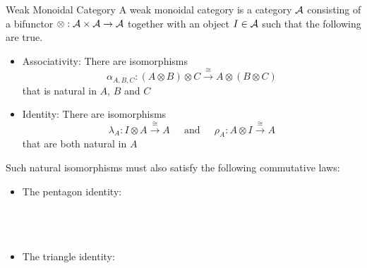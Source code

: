 \documentclass[a4paper]{article}
\begin{document}
\begin{defn}{Weak Monoidal Category}{} A weak monoidal category is a category $\mathcal{A}$ consisting of a bifunctor $\otimes:\mathcal{A}\times\mathcal{A}\to\mathcal{A}$ together with an object $I\in\mathcal{A}$ such that the following are true. 
\begin{itemize}
\item Associativity: There are isomorphisms $$\alpha_{A,B,C}:(A\otimes B)\otimes C\overset{\cong}{\longrightarrow} A\otimes(B\otimes C)$$ that is natural in $A$, $B$ and $C$
\item Identity: There are isomorphisms $$\lambda_A:I\otimes A\overset{\cong}{\longrightarrow} A\;\;\;\;\text{ and }\;\;\;\;\rho_A:A\otimes I\overset{\cong}{\longrightarrow} A$$ that are both natural in $A$
\end{itemize}
Such natural isomorphisms must also satisfy the following commutative laws: 
\begin{itemize}
\item The pentagon identity: \\~\\
\\~\\
\item The triangle identity: \\~\\
\\~\\
\end{itemize}
\end{defn}
\end{document}
